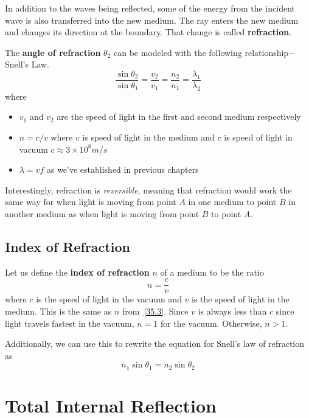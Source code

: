 In addition to the waves being reflected, some of the energy from the incident wave is also transferred
into the new medium. The ray enters the new medium and changes its direction at the boundary. That 
change is called \textbf{refraction}.

The \textbf{angle of refraction} $\theta_2$ can be modeled with the following relationship$-$Snell's Law.
\begin{equation}\label{35.3}
    \frac{\sin\theta_2}{\sin\theta_1} = \frac{v_2}{v_1} = \frac{n_2}{n_1} = \frac{\lambda_1}{\lambda_2}
\end{equation}
where 
\begin{itemize}
    \item $v_1$ and $v_2$ are the speed of light in the first and second medium respectively
    \item $n = c/v$ where $v$ is speed of light in the medium and $c$ is speed of light in vacuum
        $c \approx 3 \times10^8 m/s$
    \item $\lambda = vf$ as we've established in previous chapters
\end{itemize}

Interestingly, refraction is \textit{reversible}, meaning that refraction would work the same way
for when light is moving from point $A$ in one medium to point $B$ in another medium as when light 
is moving from point $B$ to point $A$.

\subsection{Index of Refraction}

Let us define the \textbf{index of refraction} $n$ of a medium to be the ratio 
\begin{equation}\label{35.4}
    n = \frac{c}{v}
\end{equation}
where $c$ is the speed of light in the vacuum and $v$ is the speed of light in the medium.
This is the same as $n$ from~\eqref{35.3}. Since $v$ is always less than $c$ since light travels 
fastest in the vacuum, $n=1$ for the vacuum. Otherwise, $n > 1$.

Additionally, we can use this to rewrite the equation for Snell's law of refraction as 
\begin{equation}
    n_1\sin\theta_1 = n_2\sin\theta_2
\end{equation}

\section{Total Internal Reflection}

